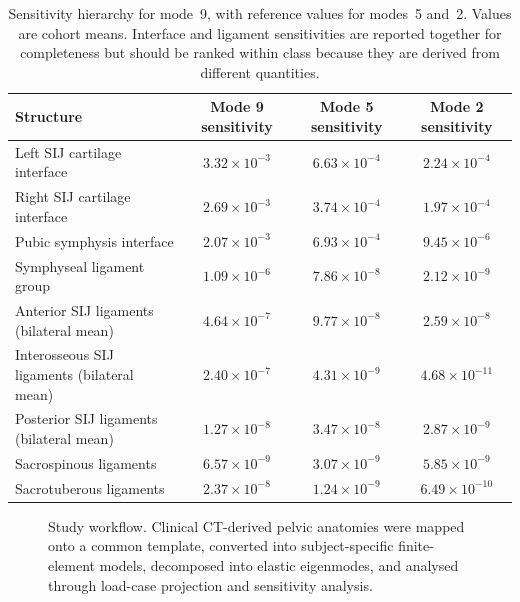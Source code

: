 \documentclass[openacc]{rsproca_new}
\begin{document}
\begin{table}[p]
\centering
\caption{Sensitivity hierarchy for mode~9, with reference values for modes~5 and~2. Values are cohort means. Interface and ligament sensitivities are reported together for completeness but should be ranked within class because they are derived from different quantities.}
\label{tab:sensitivity}
\begin{tabular}{lccc}
\toprule
Structure & Mode 9 sensitivity & Mode 5 sensitivity & Mode 2 sensitivity \\
\midrule
Left SIJ cartilage interface & $3.32 \times 10^{-3}$ & $6.63 \times 10^{-4}$ & $2.24 \times 10^{-4}$ \\
Right SIJ cartilage interface & $2.69 \times 10^{-3}$ & $3.74 \times 10^{-4}$ & $1.97 \times 10^{-4}$ \\
Pubic symphysis interface & $2.07 \times 10^{-3}$ & $6.93 \times 10^{-4}$ & $9.45 \times 10^{-6}$ \\
Symphyseal ligament group & $1.09 \times 10^{-6}$ & $7.86 \times 10^{-8}$ & $2.12 \times 10^{-9}$ \\
Anterior SIJ ligaments (bilateral mean) & $4.64 \times 10^{-7}$ & $9.77 \times 10^{-8}$ & $2.59 \times 10^{-8}$ \\
Interosseous SIJ ligaments (bilateral mean) & $2.40 \times 10^{-7}$ & $4.31 \times 10^{-9}$ & $4.68 \times 10^{-11}$ \\
Posterior SIJ ligaments (bilateral mean) & $1.27 \times 10^{-8}$ & $3.47 \times 10^{-8}$ & $2.87 \times 10^{-9}$ \\
Sacrospinous ligaments & $6.57 \times 10^{-9}$ & $3.07 \times 10^{-9}$ & $5.85 \times 10^{-9}$ \\
Sacrotuberous ligaments & $2.37 \times 10^{-8}$ & $1.24 \times 10^{-9}$ & $6.49 \times 10^{-10}$ \\
\bottomrule
\end{tabular}
\end{table}

\begin{figure}[p]
\centering
{}
\caption{Study workflow. Clinical CT-derived pelvic anatomies were mapped onto a common template, converted into subject-specific finite-element models, decomposed into elastic eigenmodes, and analysed through load-case projection and sensitivity analysis.}
\label{fig:workflow}
\end{figure}
\end{document}
